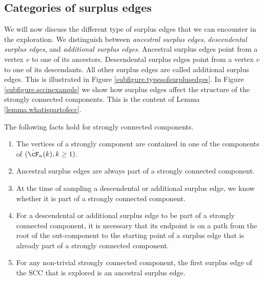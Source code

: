 \subsection{Categories of surplus edges}\label{subsec.categoriessurplusedged}
We will now discuss the different type of surplus edges that we can encounter in the exploration. We distinguish between \emph{ancestral surplus edges}, \emph{descendental surplus edges}, and \emph{additional surplus edges}.  Ancestral surplus edges point from a vertex $v$ to one of its ancestors. Descendental surplus edges point from a vertex $v$ to one of its descendants. All other surplus edges are called additional surplus edges. This is illustrated in Figure \ref{subfigure.typesofsurplusedges}. In Figure \ref{subfigure.sccinexample} we show how surplus edges affect the structure of the strongly connected components. This is the content of Lemma \ref{lemma.whatispartofscc}.
\begin{lemma}\label{lemma.whatispartofscc}
The following facts hold for strongly connected components. 
\begin{enumerate}
\item \label{item.factsonsccs1}The vertices of a strongly component are contained in one of the components of $(\hat{\cF}_n(k),k\geq 1)$.  
\item \label{item.factsonsccs2} Ancestral surplus edges are always part of a strongly connected component.
\item \label{item.factsonsccs3} At the time of sampling a descendental or additional surplus edge, we know whether it is part of a strongly connected component. 
\item \label{item.factsonsccs4} For a descendental or additional surplus edge to be part of a strongly connected component, it is necessary that its endpoint is on a path from the root of the out-component to the starting point of a surplus edge that is already part of a strongly connected component.
\item \label{item.factsonsccs5} For any non-trivial strongly connected component, the first surplus edge of the SCC that is explored is an ancestral surplus edge. 
\end{enumerate}
\end{lemma}
